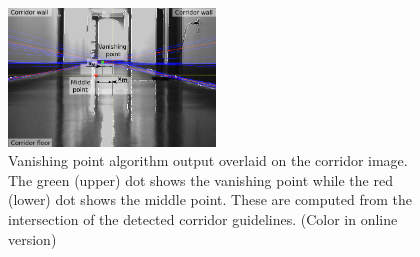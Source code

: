 \begin{figure}[tb]
	\centering
	\includegraphics[width=0.49\textwidth]{Figs/vpmpimages/labelled_corridor_4.png}
	\caption{Vanishing point algorithm output overlaid on the corridor image. The green (upper) dot shows the vanishing point while the red (lower) dot shows the middle point. These are computed from the intersection of the detected corridor guidelines. (Color in online version)}
	\label{fig:vp_viz} %
\end{figure}

%
%
%
%

